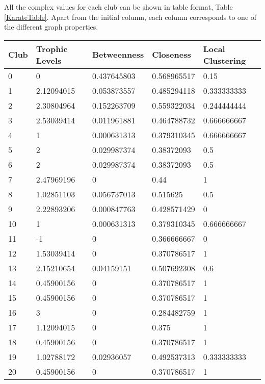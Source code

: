 All the complex values for each club can be shown in table format, Table \ref{KarateTable}. Apart from the initial column, each column corresponds to one of the different graph properties.

\begin{table}[!htb]
    \centering
    \small
    \begin{tabular}{|l|l|l|l|l|}
        \hline
        \textbf{Club} & \textbf{Trophic Levels} & \textbf{Betweenness} & \textbf{Closeness} & \textbf{Local Clustering} \\ \hline
        0 & 0 & 0.437645803 & 0.568965517 & 0.15 \\ \hline
        1 & 2.12094015 & 0.053873557 & 0.485294118 & 0.333333333 \\ \hline
        2 & 2.30804964 & 0.152263709 & 0.559322034 & 0.244444444 \\ \hline
        3 & 2.53039414 & 0.011961881 & 0.464788732 & 0.666666667 \\ \hline
        4 & 1 & 0.000631313 & 0.379310345 & 0.666666667 \\ \hline
        5 & 2 & 0.029987374 & 0.38372093 & 0.5 \\ \hline
        6 & 2 & 0.029987374 & 0.38372093 & 0.5 \\ \hline
        7 & 2.47969196 & 0 & 0.44 & 1 \\ \hline
        8 & 1.02851103 & 0.056737013 & 0.515625 & 0.5 \\ \hline
        9 & 2.22893206 & 0.000847763 & 0.428571429 & 0 \\ \hline
        10 & 1 & 0.000631313 & 0.379310345 & 0.666666667 \\ \hline
        11 & -1 & 0 & 0.366666667 & 0 \\ \hline
        12 & 1.53039414 & 0 & 0.370786517 & 1 \\ \hline
        13 & 2.15210654 & 0.04159151 & 0.507692308 & 0.6 \\ \hline
        14 & 0.45900156 & 0 & 0.370786517 & 1 \\ \hline
        15 & 0.45900156 & 0 & 0.370786517 & 1 \\ \hline
        16 & 3 & 0 & 0.284482759 & 1 \\ \hline
        17 & 1.12094015 & 0 & 0.375 & 1 \\ \hline
        18 & 0.45900156 & 0 & 0.370786517 & 1 \\ \hline
        19 & 1.02788172 & 0.02936057 & 0.492537313 & 0.333333333 \\ \hline
        20 & 0.45900156 & 0 & 0.370786517 & 1 \\ \hline

\end{tabular}
\end{table}
